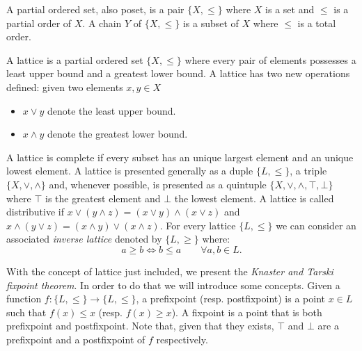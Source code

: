 \begin{definition}
  A partial ordered set, also poset, is a pair $\{X, \le\}$ where $X$ is a set and $\le$ is a partial order of $X$. A chain $Y$ of $\{X, \le\}$ is a subset of $X$ where $\le$ is a total order. 
\end{definition}


\begin{definition} A lattice is a partial ordered set 
$ \{X,\le\} $ where every pair of elements possesses a least upper bound and a greatest lower bound. A lattice has two new operations defined: given two elements $x,y\in X$
  \begin{itemize}
  \item $x\vee y$ denote the least upper bound.
  \item $x\wedge y$  denote the greatest lower bound.
  \end{itemize}
\end{definition}


  A lattice is complete if every subset has an unique largest element and an unique lowest element. A lattice is presented generally as a duple $\{L,\le\}$, a triple $\{X,\vee,\wedge\}$ and, whenever possible, is presented as a quintuple $\{X, \vee, \wedge, \top,\bot\}$ where $\top$ is the greatest element and $\bot$ the lowest element. A lattice is called distributive if $x\vee(y \wedge z) = (x\vee y) \wedge (x \vee z)$ and $x\wedge(y \vee z) = (x\wedge y) \vee (x \wedge z)$. For every lattice $\{L,\le\}$ we can consider an associated \emph{inverse lattice} denoted by $\{L,\ge\}$ where: $$ a \ge b \iff b \le a\qquad  \forall a,b \in L.$$


With the concept of lattice just included, we present the \emph{Knaster and Tarski fixpoint theorem}. In order to do that we will introduce some concepts. Given a function $f:\{L,\le\}\to \{L,\le\}$, a prefixpoint (resp. postfixpoint) is a point $x \in L$ such that $f(x) \le x$ (resp. $f(x) \ge x$). A fixpoint is a point that is both prefixpoint and postfixpoint. Note that, given that they exists, $\top$ and $\bot$ are a prefixpoint and a postfixpoint of $f$ respectively.

